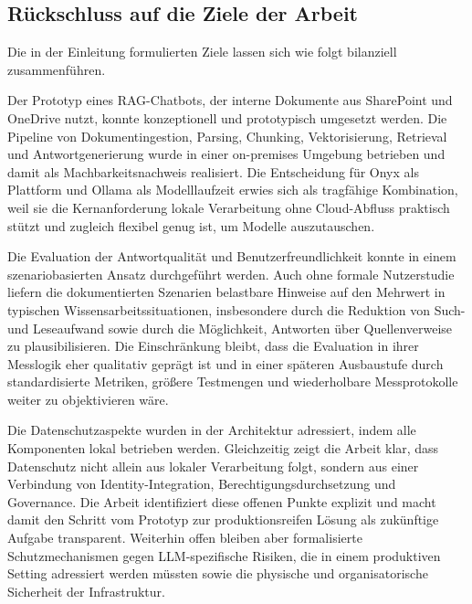 \subsection{Rückschluss auf die Ziele der Arbeit}\label{subsec:ruckschluss-auf-die-ziele-der-arbeit}

Die in der Einleitung formulierten Ziele lassen sich wie folgt bilanziell zusammenführen.

Der Prototyp eines RAG-Chatbots, der interne Dokumente aus SharePoint und OneDrive nutzt, konnte konzeptionell und prototypisch umgesetzt werden.
Die Pipeline von Dokumentingestion, Parsing, Chunking, Vektorisierung, Retrieval und Antwortgenerierung wurde in einer on-premises Umgebung betrieben und damit als Machbarkeitsnachweis realisiert.
Die Entscheidung für Onyx als Plattform und Ollama als Modelllaufzeit erwies sich als tragfähige Kombination, weil sie die Kernanforderung \glqq lokale Verarbeitung ohne Cloud-Abfluss\grqq{} praktisch stützt und zugleich flexibel genug ist, um Modelle auszutauschen.

Die Evaluation der Antwortqualität und Benutzerfreundlichkeit konnte in einem szenariobasierten Ansatz durchgeführt werden.
Auch ohne formale Nutzerstudie liefern die dokumentierten Szenarien belastbare Hinweise auf den Mehrwert in typischen Wissensarbeitssituationen, insbesondere durch die Reduktion von Such- und Leseaufwand sowie durch die Möglichkeit, Antworten über Quellenverweise zu plausibilisieren.
Die Einschränkung bleibt, dass die Evaluation in ihrer Messlogik eher qualitativ geprägt ist und in einer späteren Ausbaustufe durch standardisierte Metriken, größere Testmengen und wiederholbare Messprotokolle weiter zu objektivieren wäre.

Die Datenschutzaspekte wurden in der Architektur adressiert, indem alle Komponenten lokal betrieben werden.
Gleichzeitig zeigt die Arbeit klar, dass Datenschutz nicht allein aus lokaler Verarbeitung folgt, sondern aus einer Verbindung von Identity-Integration, Berechtigungsdurchsetzung und Governance.
Die Arbeit identifiziert diese offenen Punkte explizit und macht damit den Schritt vom Prototyp zur produktionsreifen Lösung als zukünftige Aufgabe transparent.
Weiterhin offen bleiben aber formalisierte Schutzmechanismen gegen LLM-spezifische Risiken, die in einem produktiven Setting adressiert werden müssten sowie die physische und organisatorische Sicherheit der Infrastruktur.


